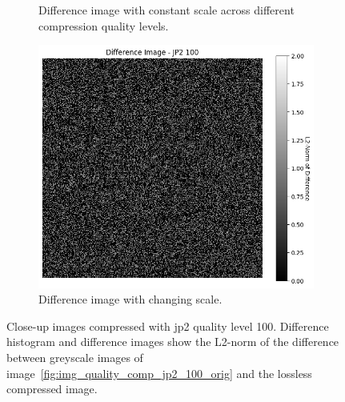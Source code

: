 \begin{figure}[htb]
\begin{subfigure}[b]{0.48\textwidth}
        \caption{Difference image with constant scale across different compression quality levels.}
        \label{fig:img_quality_comp_jp2_100_center_diff}
    \end{subfigure}
    \begin{subfigure}[b]{0.48\textwidth}
        \centering
        \includegraphics[width=\textwidth]{doc/thesis/0_figures/compare_quality/set1/jp2_100_center_diff_heatmap_rel.png}
        \caption{Difference image with changing scale.}
        \label{fig:img_quality_comp_jp2_100_center_diff_rel}
    \end{subfigure}
    \caption{Close-up images compressed with \gls{jp2} quality level 100. Difference histogram and difference images show the L2-norm of the difference between greyscale images of image~\ref{fig:img_quality_comp_jp2_100_orig} and the lossless compressed image.}
    \label{fig:img_quality_comp_jp2_100_center}
\end{figure}


